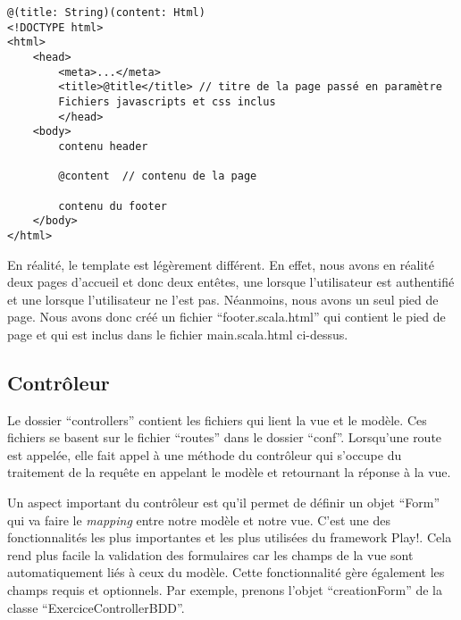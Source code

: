 \lstset{style=customXml}
\begin{lstlisting}
@(title: String)(content: Html)
<!DOCTYPE html>
<html>
    <head>
        <meta>...</meta>
        <title>@title</title> // titre de la page passé en paramètre 
        Fichiers javascripts et css inclus 
        </head>
    <body>
    	contenu header
    	
    	@content  // contenu de la page
    	
    	contenu du footer
    </body>
</html>    	 
\end{lstlisting}   

En réalité, le template est légèrement différent. En effet, nous avons en réalité deux pages d'accueil et donc deux entêtes, une lorsque l'utilisateur est authentifié et une lorsque l'utilisateur ne l'est pas. Néanmoins, nous avons un seul pied de page. Nous avons donc créé un fichier \enquote{footer.scala.html} qui contient le pied de page et qui est inclus dans le fichier main.scala.html ci-dessus. 

\subsection{Contrôleur} 

Le dossier \enquote{controllers} contient les fichiers qui lient la vue et le modèle. Ces fichiers se basent sur le fichier \enquote{routes} dans le dossier \enquote{conf}. Lorsqu'une route est appelée, elle fait appel à une méthode du contrôleur qui s'occupe du traitement de la requête en appelant le modèle et retournant la réponse à la vue. 

Un aspect important du contrôleur est qu'il permet de définir un objet \enquote{Form} qui va faire le \emph{mapping} entre notre modèle et notre vue. C'est une des fonctionnalités les plus importantes et les plus utilisées du framework Play!. Cela rend plus facile la validation des formulaires car les champs de la vue sont automatiquement liés à ceux du modèle. Cette fonctionnalité gère également les champs requis et optionnels. Par exemple, prenons l'objet \enquote{creationForm} de la classe \enquote{ExerciceControllerBDD}. 

